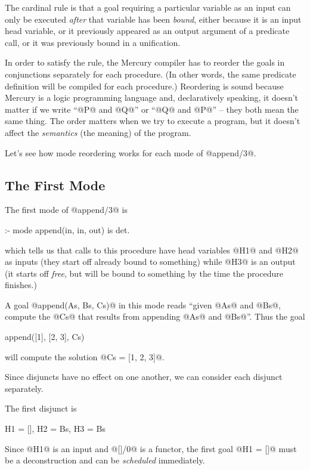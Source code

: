The cardinal rule is that a goal requiring a particular variable as an
input can only be executed \emph{after} that variable has been
\emph{bound}, either because it is an input head variable, or it
previously appeared as an output argument of a predicate call, or it was
previously bound in a unification.

In order to satisfy the rule, the Mercury compiler has to reorder the
goals in conjunctions separately for each procedure.  (In other words,
the same predicate definition will be compiled for each
procedure.)
Reordering is sound because
Mercury is a logic programming language and, declaratively speaking, it
doesn't matter if we write ``@P@ and @Q@'' or ``@Q@ and @P@'' -- they
both mean the same thing.  The order matters when we try to execute
a program, but it doesn't affect the \emph{semantics} (\ie the meaning)
of the program.

Let's see how mode reordering works for each mode of @append/3@.

\subsection{The First Mode}

The first mode of @append/3@ is
\begin{myverbatim}
:- mode append(in, in, out) is det.
\end{myverbatim}
which tells us that calls to this procedure have head variables @H1@ and
@H2@ as inputs (\ie they start off already bound to something) while
@H3@ is an output (\ie it starts off \emph{free}, but will be bound to
something by the time the procedure finishes.)

A goal @append(As, Bs, Cs)@ in this mode reads ``given @As@ and @Bs@,
compute the @Cs@ that results from appending @As@ and @Bs@''.  Thus the
goal
\begin{myverbatim}
    append([1], [2, 3], Cs)
\end{myverbatim}
will compute the solution @Cs = [1, 2, 3]@.

Since disjuncts have no effect on one another, we can consider each
disjunct separately.

The first disjunct is
\begin{myverbatim}
    H1 = [],
    H2 = Bs,
    H3 = Bs
\end{myverbatim}
Since @H1@ is an input and @[]/0@ is a functor, the first goal @H1 = []@
must be a deconstruction and can be \emph{scheduled} immediately.


